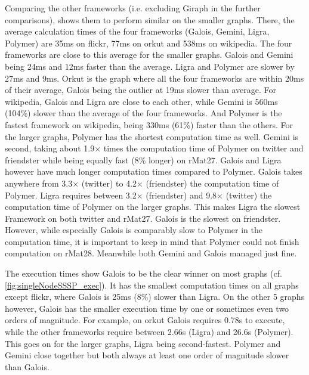 Comparing the other frameworks (i.e. excluding Giraph in the further comparisons), shows them to perform similar on the smaller graphs. There, the average calculation times of the four frameworks (Galois, Gemini, Ligra, Polymer) are 35ms on flickr, 77ms on orkut and 538ms on wikipedia. 
The four frameworks are close to this average for the smaller graphs. Galois and Gemini being 24ms and 12ms faster than the average. Ligra and Polymer are slower by 27ms and 9ms.
Orkut is the graph where all the four frameworks are within 20ms of their average, Galois being the outlier at 19ms slower than average.
For wikipedia, Galois and Ligra are close to each other, while Gemini is 560ms (104\%) slower than the average of the four frameworks.
And Polymer is the fastest framework on wikipedia, being 330ms (61\%) faster than the others.
For the larger graphs, Polymer has the shortest computation time as well. Gemini is second, taking about 1.9$\times$ times the computation time of Polymer on twitter and friendster while being equally fast (8\% longer) on rMat27. Galois and Ligra however have much longer computation times compared to Polymer. Galois takes anywhere from 3.3$\times$ (twitter) to 4.2$\times$ (friendster) the computation time of Polymer.
Ligra requires between 3.2$\times$ (friendster) and 9.8$\times$ (twitter) the computation time of Polymer on the larger graphs. This makes Ligra the slowest Framework on both twitter and rMat27. Galois is the slowest on friendster.
However, while especially Galois is comparably slow to Polymer in the computation time, it is important to keep in mind that Polymer could not finish computation on rMat28. Meanwhile both Gemini and Galois managed just fine.

The execution times show Galois to be the clear winner on most graphs (cf. \autoref{fig:singleNodeSSSP_exec}).
It has the smallest computation times on all graphs except flickr, where Galois is 25ms (8\%) slower than Ligra. 
On the other 5 graphs however, Galois has the smaller execution time by one or sometimes even two orders of magnitude. 
For example, on orkut Galois requires 0.78s to execute, while the other frameworks require between 2.66s (Ligra) and 26.6s (Polymer).
This goes on for the larger graphs, Ligra being second-fastest. Polymer and Gemini close together but both always at least one order of magnitude slower than Galois.

